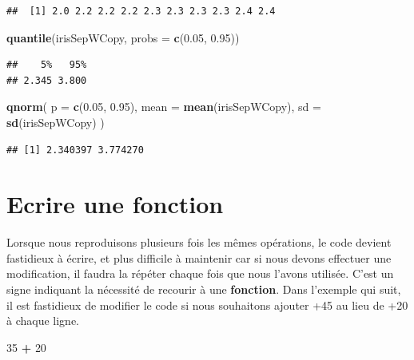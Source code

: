 \documentclass[
]{book}
\newenvironment{Shaded}{\begin{snugshade}}{\end{snugshade}}
\newcommand{\DataTypeTok}[1]{\textcolor[rgb]{0.13,0.29,0.53}{#1}}
\newcommand{\DecValTok}[1]{\textcolor[rgb]{0.00,0.00,0.81}{#1}}
\newcommand{\FloatTok}[1]{\textcolor[rgb]{0.00,0.00,0.81}{#1}}
\newcommand{\KeywordTok}[1]{\textcolor[rgb]{0.13,0.29,0.53}{\textbf{#1}}}
\newcommand{\NormalTok}[1]{#1}
\newcommand{\OperatorTok}[1]{\textcolor[rgb]{0.81,0.36,0.00}{\textbf{#1}}}
\newcommand{\StringTok}[1]{\textcolor[rgb]{0.31,0.60,0.02}{#1}}
\begin{document}
\begin{verbatim}
##  [1] 2.0 2.2 2.2 2.2 2.3 2.3 2.3 2.3 2.4 2.4
\end{verbatim}

\begin{Shaded}
\begin{Highlighting}[]
\KeywordTok{quantile}\NormalTok{(irisSepWCopy, }\DataTypeTok{probs =} \KeywordTok{c}\NormalTok{(}\FloatTok{0.05}\NormalTok{, }\FloatTok{0.95}\NormalTok{))}
\end{Highlighting}
\end{Shaded}

\begin{verbatim}
##    5%   95% 
## 2.345 3.800
\end{verbatim}

\begin{Shaded}
\begin{Highlighting}[]
\KeywordTok{qnorm}\NormalTok{(}
  \DataTypeTok{p =} \KeywordTok{c}\NormalTok{(}\FloatTok{0.05}\NormalTok{, }\FloatTok{0.95}\NormalTok{), }
  \DataTypeTok{mean =} \KeywordTok{mean}\NormalTok{(irisSepWCopy), }
  \DataTypeTok{sd =} \KeywordTok{sd}\NormalTok{(irisSepWCopy)}
\NormalTok{)}
\end{Highlighting}
\end{Shaded}

\begin{verbatim}
## [1] 2.340397 3.774270
\end{verbatim}

\hypertarget{l015function}{%
\section{Ecrire une fonction}\label{l015function}}

Lorsque nous reproduisons plusieurs fois les mêmes opérations, le code devient fastidieux à écrire, et plus difficile à maintenir car si nous devons effectuer une modification, il faudra la répéter chaque fois que nous l'avons utilisée. C'est un signe indiquant la nécessité de recourir à une \textbf{fonction}. Dans l'exemple qui suit, il est fastidieux de modifier le code si nous souhaitons ajouter +45 au lieu de +20 à chaque ligne.

\begin{Shaded}
\begin{Highlighting}[]
\DecValTok{35} \OperatorTok{+}\StringTok{ }\DecValTok{20}
\end{Highlighting}
\end{Shaded}
\end{document}
